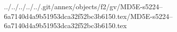 ../../../../../.git/annex/objects/f2/gv/MD5E-s5224--6a7140d4a9b51953dca32f52bc3b6150.tex/MD5E-s5224--6a7140d4a9b51953dca32f52bc3b6150.tex